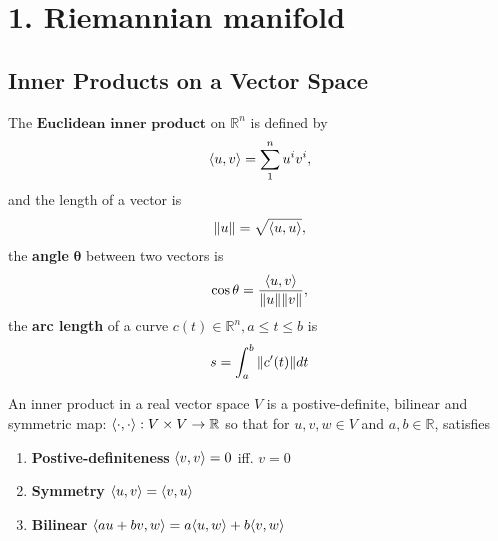 
\section[Lecture 1--{Riemannian manifold}]{1. Riemannian manifold}

\subsection{Inner Products on a Vector Space}
The $\textbf{Euclidean inner product}$ on $\mathbb{R}^n$ is defined by
\begin{align}
    \langle u, v \rangle=\sum_{1}^{n}u^i v^i,
\end{align}
and the length of a vector is
\begin{align}
    \| u \|=\sqrt{\langle u, u \rangle},
\end{align}
the \textbf{angle} $\boldsymbol{\theta}$ between two vectors is
\begin{align}
    \cos \theta = \frac{\langle u, v \rangle}{\| u \|\| v \|},
\end{align}
the \textbf{arc length} of a curve $c(t) \in \mathbb{R}^n, a \leq t \leq b$ is 
\begin{align}
    s = \int_{a}^{b} \| c'(t) \| dt
\end{align}

\begin{definition}
    An inner product in a real vector space $V$ is a postive-definite,
    bilinear and symmetric map: $\langle \cdot, \cdot \rangle: 
    V \times V \rightarrow \mathbb{R}$ 
    so that for $u,v,w \in V$ and $a,b\in \mathbb{R}$, satisfies
    \begin{enumerate}[label= (\roman*)]
        \item \textbf{Postive-definiteness} $\langle v, v \rangle=0$ iff. $v=0$
        \item \textbf{Symmetry} $\langle u, v \rangle=\langle v, u \rangle$
        \item \textbf{Bilinear} $\langle au+bv, w \rangle=a\langle u, w \rangle+b\langle v, w \rangle$
    \end{enumerate}
\label{def. inner prodcut}
\end{definition}

